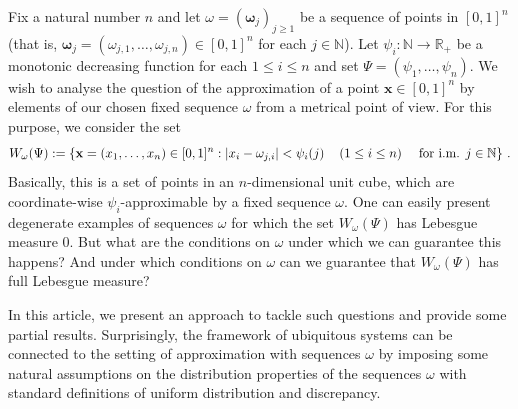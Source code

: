 \documentclass{amsart}
\theoremstyle{definition}
\newcommand{\N}{\mathbb N}%
\newcommand{\R}{\mathbb R}
\newcommand{\0}{\mbf 0}%
\renewcommand{\text}{\textup}
\def\N{\mathbb N}
\def\R{\mathbb R}
\begin{document}
Fix a natural number $n$ and let $\omega=(\boldsymbol{\omega}_{j})_{j\geq 1}$ be a sequence of points in $[0,1]^{n}$ (that is, $\boldsymbol{\omega}_{j}=(\omega_{j,1}, \dots , \omega_{j,n})\in [0,1]^{n}$ for each $j\in\N$). Let $\psi_{i}:\N\to \R_{+}$ be a monotonic decreasing function for each $1\leq i \leq n$ and set $\Psi=(\psi_1,\ldots, \psi_n)$. We wish to analyse the question of the approximation of a point $\mathbf{x} \in [0,1]^{n}$ by elements of our chosen fixed sequence $\omega$ from a metrical point of view. For this purpose, we consider the set 
\begin{equation*}
    W_{\omega}(\Psi):=\left\{\mathbf{x}=(x_1,\ldots,x_n) \in [0,1]^{n}: |x_{i}-\omega_{j,i}|<\psi_{i}(j) \, \quad (1\leq i \leq n) \quad \text{ for i.m. } j\in \N\right\}\, .
\end{equation*}
Basically, this is a set of points in an $n$-dimensional unit cube, which are coordinate-wise  $\psi_i$-approximable by a fixed sequence $\omega$. One can easily present degenerate examples of sequences $\omega$ for which the set $W_{\omega}(\Psi)$ has Lebesgue measure $0$. But what are the conditions on $\omega$ under which we can guarantee this happens? And under which conditions on $\omega$ can we guarantee that $W_{\omega}(\Psi)$ has full Lebesgue measure? 

In this article, we present an approach to tackle such questions and provide some partial results. Surprisingly, the framework of ubiquitous systems can be connected to the setting of approximation with sequences $\omega$ by imposing some natural assumptions on the distribution properties of the sequences $\omega$ with standard definitions of uniform distribution and discrepancy.
\end{document}
